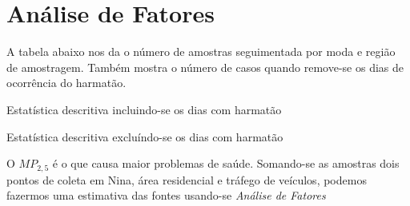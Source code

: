 \section{Análise de Fatores}

A tabela abaixo nos da o número de amostras seguimentada por
moda e região de amostragem. 
Também mostra o número de casos quando remove-se os dias de ocorrência do harmatão.



\begin{table}[H]
 \centering
  
  \caption{Estatística descritiva incluindo-se os dias com harmatão}
\end{table}

\begin{table}[H]
  \centering
  
  \caption{Estatística descritiva excluíndo-se os dias com harmatão}
\end{table}



O $MP_{2,5}$ é o que causa maior problemas de saúde. Somando-se as amostras dois pontos de coleta em Nina, área residencial e tráfego de veículos, podemos fazermos uma estimativa das fontes usando-se \textit{Análise de Fatores} 
























